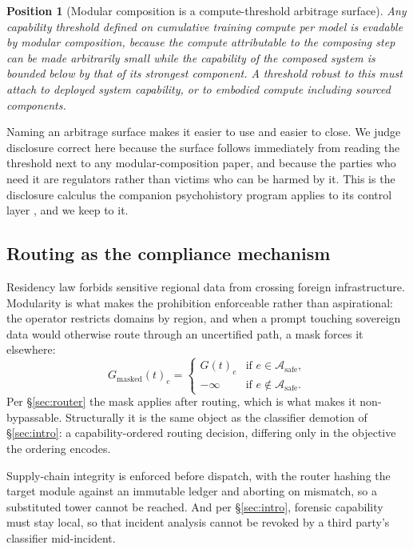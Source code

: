 \documentclass[11pt]{article}
\newtheorem{position}{Position}
\begin{document}
\begin{position}[Modular composition is a compute-threshold arbitrage surface]
\label{conj:arbitrage}
Any capability threshold defined on cumulative training compute per model is evadable by modular composition, because the compute attributable to the composing step can be made arbitrarily small while the capability of the composed system is bounded below by that of its strongest component. A threshold robust to this must attach to deployed system capability, or to embodied compute including sourced components.
\end{position}

Naming an arbitrage surface makes it easier to use and easier to close. We judge disclosure correct here because the surface follows immediately from reading the threshold next to any modular-composition paper, and because the parties who need it are regulators rather than victims who can be harmed by it. This is the disclosure calculus the companion psychohistory program applies to its control layer \cite{sharon2026psychohistory}, and we keep to it.

\subsection{Routing as the compliance mechanism}

Residency law forbids sensitive regional data from crossing foreign infrastructure. Modularity is what makes the prohibition enforceable rather than aspirational: the operator restricts domains by region, and when a prompt touching sovereign data would otherwise route through an uncertified path, a mask forces it elsewhere:
\begin{equation}
G_{\mathrm{masked}}(t)_e =
\begin{cases}
G(t)_e & \text{if } e \in \mathcal{A}_{\mathrm{safe}},\\[2pt]
-\infty & \text{if } e \notin \mathcal{A}_{\mathrm{safe}} .
\end{cases}
\label{eq:mask}
\end{equation}
Per \S\ref{sec:router} the mask applies after routing, which is what makes it non-bypassable. Structurally it is the same object as the classifier demotion of \S\ref{sec:intro}: a capability-ordered routing decision, differing only in the objective the ordering encodes.

Supply-chain integrity is enforced before dispatch, with the router hashing the target module against an immutable ledger and aborting on mismatch, so a substituted tower cannot be reached. And per \S\ref{sec:intro}, forensic capability must stay local, so that incident analysis cannot be revoked by a third party's classifier mid-incident.
\end{document}
